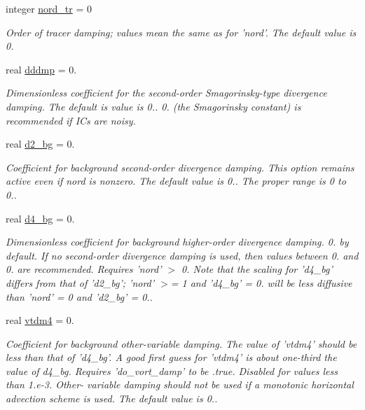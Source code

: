\begin{DoxyCompactItemize}
integer \hyperlink{structfv__arrays__mod_1_1fv__flags__type_a78c41b066c189e7e6fa24eebc9b525f2}{nord\-\_\-tr} = 0
\begin{DoxyCompactList}\small\item\em Order of tracer damping; values mean the same as for 'nord'. The default value is 0. \end{DoxyCompactList}\item 
real \hyperlink{structfv__arrays__mod_1_1fv__flags__type_abb173832e0f7594d6ac8eca3d1f9ce0a}{dddmp} = 0.
\begin{DoxyCompactList}\small\item\em Dimensionless coefficient for the second-\/order Smagorinsky-\/type divergence damping. The default is value is 0.. 0. (the Smagorinsky constant) is recommended if I\-Cs are noisy. \end{DoxyCompactList}\item 
real \hyperlink{structfv__arrays__mod_1_1fv__flags__type_a75c65cca32e02f409074fd22c3e13752}{d2\-\_\-bg} = 0.
\begin{DoxyCompactList}\small\item\em Coefficient for background second-\/order divergence damping. This option remains active even if nord is nonzero. The default value is 0.. The proper range is 0 to 0.. \end{DoxyCompactList}\item 
real \hyperlink{structfv__arrays__mod_1_1fv__flags__type_a400c02695fa4bfa1d2e4aaf21059638a}{d4\-\_\-bg} = 0.
\begin{DoxyCompactList}\small\item\em Dimensionless coefficient for background higher-\/order divergence damping. 0. by default. If no second-\/order divergence damping is used, then values between 0. and 0. are recommended. Requires 'nord' $>$ 0. Note that the scaling for 'd4\-\_\-bg' differs from that of 'd2\-\_\-bg'; 'nord' $>$= 1 and 'd4\-\_\-bg' = 0. will be less diffusive than 'nord' = 0 and 'd2\-\_\-bg' = 0.. \end{DoxyCompactList}\item 
real \hyperlink{structfv__arrays__mod_1_1fv__flags__type_ae230295af17d57507255dfe20ad98f6a}{vtdm4} = 0.
\begin{DoxyCompactList}\small\item\em Coefficient for background other-\/variable damping. The value of 'vtdm4' should be less than that of 'd4\-\_\-bg'. A good first guess for 'vtdm4' is about one-\/third the value of d4\-\_\-bg. Requires 'do\-\_\-vort\-\_\-damp' to be .true. Disabled for values less than 1.\-e-\/3. Other-\/ variable damping should not be used if a monotonic horizontal advection scheme is used. The default value is 0.. \end{DoxyCompactList}\item 

\end{DoxyCompactItemize}
